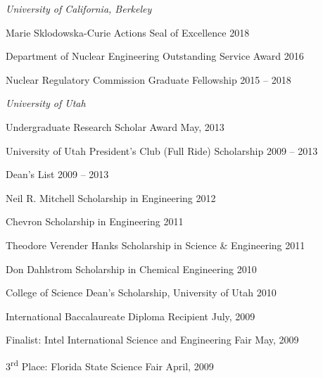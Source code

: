 
\begin{list1}
\item[] \textit{University of California, Berkeley}
\begin{list2}
\item Marie Sklodowska-Curie Actions Seal of Excellence \hfill{2018}
\item Department of Nuclear Engineering Outstanding Service Award \hfill{2016}
\item Nuclear Regulatory Commission Graduate Fellowship \hfill{2015 --  2018}
\end{list2}
\item[] \textit{University of Utah}
\begin{list2}
\item  Undergraduate Research Scholar Award \hfill{May, 2013}
\item University of Utah President's Club (Full Ride) Scholarship \hfill{2009 -- 2013}
\item Dean's List \hfill{2009 -- 2013}
\item Neil R. Mitchell Scholarship in Engineering \hfill{2012}
\item Chevron Scholarship in Engineering \hfill{2011}
\item Theodore Verender Hanks Scholarship in Science \& Engineering \hfill{2011}
\item Don Dahlstrom Scholarship in Chemical Engineering \hfill{2010}
\item College of Science Dean's Scholarship, University of Utah \hfill{2010}
\end{list2}
\item[] International Baccalaureate Diploma Recipient  \hfill{July, 2009}
\item[] Finalist: Intel International Science and Engineering Fair  \hfill{ May, 2009}
\item[] 3\textsuperscript{rd} Place: Florida State Science Fair  \hfill{April, 2009}
\end{list1}

